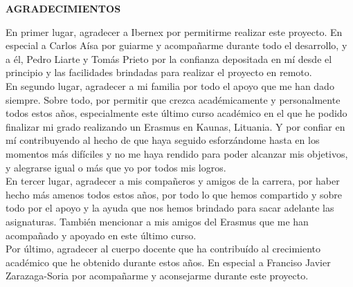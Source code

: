 \begin{center}
{\Large \bfseries AGRADECIMIENTOS}
\vspace{2.5cm}
\end{center}

En primer lugar, agradecer a Ibernex por permitirme realizar este proyecto. En especial a Carlos Aísa por guiarme y acompañarme durante todo el desarrollo, y a él, Pedro Liarte y Tomás Prieto por la confianza depositada en mí desde el principio y las facilidades brindadas para realizar el proyecto en remoto.\\

En segundo lugar, agradecer a mi familia por todo el apoyo que me han dado siempre. Sobre todo, por permitir que crezca académicamente y personalmente todos estos años, especialmente este último curso académico en el que he podido finalizar mi grado realizando un Erasmus en Kaunas, Lituania. Y por confiar en mí contribuyendo al hecho de que haya seguido esforzándome hasta en los momentos más difíciles y no me haya rendido para poder alcanzar mis objetivos, y alegrarse igual o más que yo por todos mis logros. \\

En tercer lugar, agradecer a mis compañeros y amigos de la carrera, por haber hecho más amenos todos estos años, por todo lo que hemos compartido y sobre todo por el apoyo y la ayuda que nos hemos brindado para sacar adelante las asignaturas. También mencionar a mis amigos del Erasmus que me han acompañado y apoyado en este último curso. \\

Por último, agradecer al cuerpo docente que ha contribuído al crecimiento académico que he obtenido durante estos años. En especial a Franciso Javier Zarazaga-Soria por acompañarme y aconsejarme durante este proyecto.